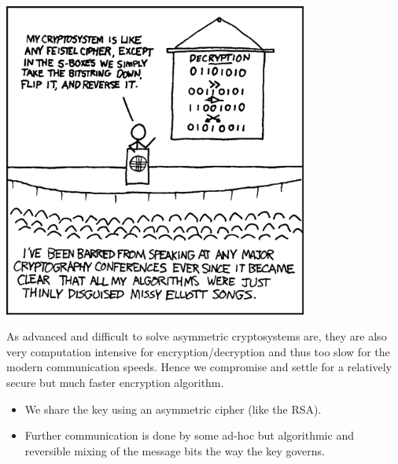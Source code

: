 \begin{center}
	\includegraphics[width=0.75\textwidth]{Photos/DES.png}
\end{center}

		As advanced and difficult to solve asymmetric cryptosystems are, they are also very computation intensive for encryption/decryption and thus too slow for the modern communication speeds. Hence we compromise and settle for a relatively secure but much faster encryption algorithm. 
		\begin{itemize}
			\item We share the key using an asymmetric cipher (like the RSA).
			\item Further communication is done by some ad-hoc but algorithmic and reversible mixing of the message bits the way the key governs.
		\end{itemize}